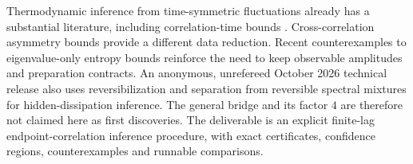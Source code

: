Thermodynamic inference from time-symmetric fluctuations already has a
substantial literature, including correlation-time bounds
\cite{rfDechant2023}. Cross-correlation asymmetry bounds
\cite{rfRaux2026} provide a different data reduction. Recent counterexamples
to eigenvalue-only entropy bounds \cite{rfShiraishi2026} reinforce the need
to keep observable amplitudes and preparation contracts. An anonymous,
unrefereed October 2026 technical release \cite{rfHidden2026} also uses
reversibilization and separation from reversible spectral mixtures for
hidden-dissipation inference. The general bridge and its factor $4$ are
therefore not claimed here as first discoveries. The deliverable is an
explicit finite-lag endpoint-correlation inference procedure, with exact
certificates, confidence regions, counterexamples and runnable comparisons.
